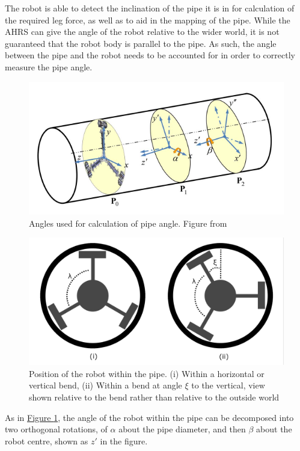 \documentclass[11pt]{article}		%
\newlength{\imageheight}	 %
\begin{document}
		The robot is able to detect the inclination of the pipe it is in for calculation of the required leg force, as well as to aid in the mapping of the pipe.
		While the AHRS can give the angle of the robot relative to the wider world, it is not guaranteed that the robot body is parallel to the pipe.
		As such, the angle between the pipe and the robot needs to be accounted for in order to correctly measure the pipe angle.
		\\
		\begin{figure}[h]
			\centering
			\includegraphics[height=\imageheight]{pipeOrientation}
			\caption{Angles used for calculation of pipe angle. Figure from \cite{park2010normal}}
			\label{pipeOrientation}
		\end{figure}
		\begin{figure}[h]
			\centering
			\includegraphics[height=\imageheight]{pipeAngle}
			\caption{Position of the robot within the pipe. (i) Within a horizontal or vertical bend, (ii) Within a bend at angle $\xi$ to the vertical, view shown relative to the bend rather than relative to the outside world}
			\label{pipeAngle}
		\end{figure}
		As in \hyperref[pipeOrientation]{Figure \ref*{pipeOrientation}}, the angle of the robot within the pipe can be decomposed into two orthogonal rotations, of $\alpha$ about the pipe diameter, and then $\beta$ about the robot centre, shown as $z'$ in the figure.
\end{document}
